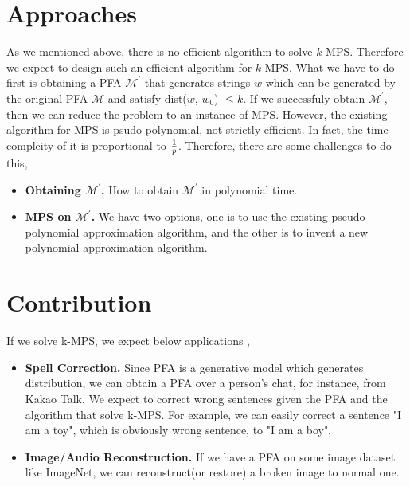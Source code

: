 \documentclass[a4paper]{article}
\begin{document}
\section{Approaches}
As we mentioned above, there is no efficient algorithm to solve $k$-MPS. Therefore we expect to design such an efficient algorithm for $k$-MPS. What we have to do first is obtaining a PFA $\mathcal{M}^{'}$ that generates strings $w$ which can be generated by the original PFA $\mathcal{M}$ and satisfy dist($w$, $w_{0}$) $\leq k$. If we successfuly obtain $\mathcal{M}^{'}$, then we can reduce the problem to an instance of MPS.
However, the existing algorithm for MPS is psudo-polynomial, not strictly efficient. In fact, the time compleity of it is proportional to ${1} \over {p}$. Therefore, there are some challenges to do this,
\begin{itemize}
\item \textbf{Obtaining $\mathcal{M}^{'}$.} How to obtain $\mathcal{M}^{'}$ in polynomial time.
\item \textbf{MPS on $\mathcal{M}^{'}$.} We have two options, one is to use the existing pseudo-polynomial approximation  algorithm\cite{de2013most}, and the other is to invent a new polynomial approximation algorithm.
\end{itemize}


\section{Contribution}
If we solve k-MPS, we expect below applications \cite{cognetta2018online},
\begin{itemize}
\item \textbf{Spell Correction.} Since PFA is a generative model which generates distribution, we can obtain a PFA over a person's chat, for instance, from Kakao Talk. We expect to correct wrong sentences given the PFA and the algorithm that solve k-MPS. For example, we can easily correct a sentence "I am a toy", which is obviously wrong sentence, to "I am a boy".
\item \textbf{Image/Audio Reconstruction.} If we have a PFA on some image dataset like ImageNet, we can reconstruct(or restore) a broken image to normal one.
\end{itemize}
\end{document}
